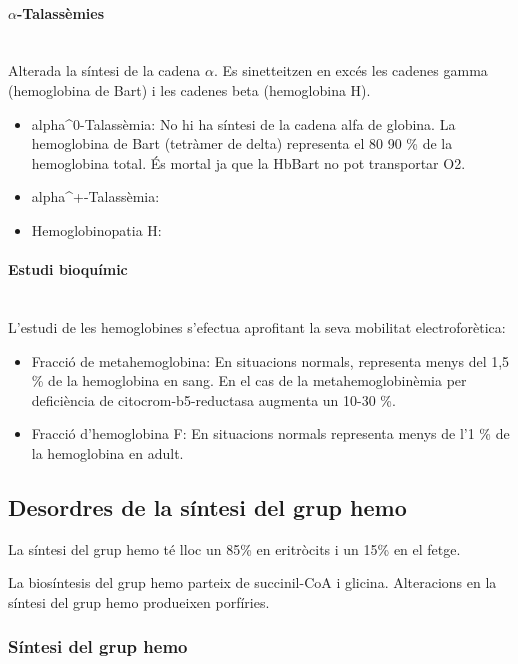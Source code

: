 \paragraph{$\alpha$-Talassèmies} \hfill \\
Alterada la síntesi de la cadena $\alpha$. Es sinetteitzen en excés les
cadenes gamma (hemoglobina de Bart) i les cadenes beta (hemoglobina
H).

\begin{itemize}
\item alpha^0-Talassèmia: No hi ha síntesi de la cadena alfa de
  globina. La hemoglobina de Bart (tetràmer de delta) representa el 80
  90 \% de la hemoglobina total. És mortal ja que la HbBart no pot
    transportar O2.

  \item alpha^+-Talassèmia: 

  \item Hemoglobinopatia H: 
\end{itemize}

\paragraph*{Estudi bioquímic} \hfill \\
L'estudi de les hemoglobines s'efectua aprofitant la seva mobilitat
electroforètica:
\begin{itemize}
\item Fracció de metahemoglobina: En situacions normals, representa
  menys del 1,5 \% de la hemoglobina en sang. En el cas de la
  metahemoglobinèmia per deficiència de citocrom-b5-reductasa augmenta
  un 10-30 \%.

\item Fracció d'hemoglobina F: En situacions normals representa menys
  de l'1 \% de la hemoglobina en adult.


\end{itemize}


\subsection{Desordres de la síntesi del grup hemo}
La síntesi del grup hemo té lloc un 85\% en eritròcits i un 15\% en el
fetge.

La biosíntesis del grup hemo parteix de succinil-CoA i
glicina. Alteracions en la síntesi del grup hemo produeixen porfíries.

\subsubsection*{Síntesi del grup hemo}


